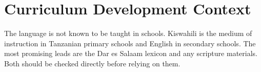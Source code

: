 \documentclass[12pt]{article}
\begin{document}
\section{Curriculum Development Context}
The language is not known to be taught in schools. Kiswahili is the medium of instruction in Tanzanian primary schools and English in secondary schools. The most promising leads are the Dar es Salaam lexicon and any scripture materials. Both should be checked directly before relying on them.
\end{document}
